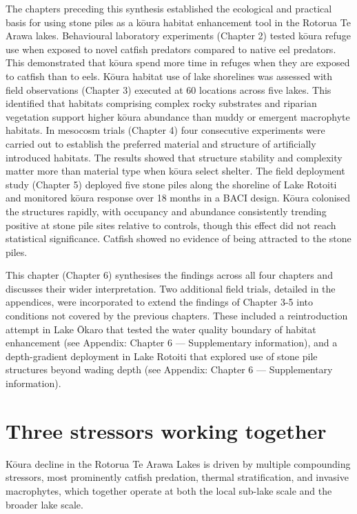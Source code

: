 \documentclass[
  12pt,
  a4paper,
  oneside]{scrbook}
\begin{document}
The chapters preceding this synthesis established the ecological and
practical basis for using stone piles as a kōura habitat enhancement
tool in the Rotorua Te Arawa lakes. Behavioural laboratory experiments
(Chapter 2) tested kōura refuge use when exposed to novel catfish
predators compared to native eel predators. This demonstrated that kōura
spend more time in refuges when they are exposed to catfish than to
eels. Kōura habitat use of lake shorelines was assessed with field
observations (Chapter 3) executed at 60 locations across five lakes.
This identified that habitats comprising complex rocky substrates and
riparian vegetation support higher kōura abundance than muddy or
emergent macrophyte habitats. In mesocosm trials (Chapter 4) four
consecutive experiments were carried out to establish the preferred
material and structure of artificially introduced habitats. The results
showed that structure stability and complexity matter more than material
type when kōura select shelter. The field deployment study (Chapter 5)
deployed five stone piles along the shoreline of Lake Rotoiti and
monitored kōura response over 18 months in a BACI design. Kōura
colonised the structures rapidly, with occupancy and abundance
consistently trending positive at stone pile sites relative to controls,
though this effect did not reach statistical significance. Catfish
showed no evidence of being attracted to the stone piles.

This chapter (Chapter 6) synthesises the findings across all four
chapters and discusses their wider interpretation. Two additional field
trials, detailed in the appendices, were incorporated to extend the
findings of Chapter 3-5 into conditions not covered by the previous
chapters. These included a reintroduction attempt in Lake Ōkaro that
tested the water quality boundary of habitat enhancement (see Appendix:
Chapter 6 --- Supplementary information), and a depth-gradient
deployment in Lake Rotoiti that explored use of stone pile structures
beyond wading depth (see Appendix: Chapter 6 --- Supplementary
information).

\section{Three stressors working
together}\label{three-stressors-working-together}

Kōura decline in the Rotorua Te Arawa Lakes is driven by multiple
compounding stressors, most prominently catfish predation, thermal
stratification, and invasive macrophytes, which together operate at both
the local sub-lake scale and the broader lake scale.
\end{document}

